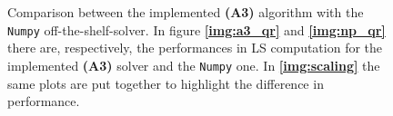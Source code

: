 \begin{figure}[H]
	\begin{subfigure}{.4\textwidth}
	    \centering
	\end{subfigure}
    
	\caption{Comparison between the implemented \textbf{(A3)} algorithm with the \texttt{Numpy} off-the-shelf-solver. In figure \textbf{\ref{img:a3_qr}} and \textbf{\ref{img:np_qr}} there are, respectively, the performances in LS computation for the implemented \textbf{(A3)} solver and the \texttt{Numpy} one. In \textbf{\ref{img:scaling}} the same plots are put together to highlight the difference in performance.}
	\label{fig:scaling_ls}
\end{figure}

